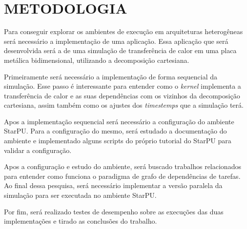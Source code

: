 
\chapter{METODOLOGIA}
\label{chap:metodologia}

Para conseguir explorar os ambientes de execução em arquiteturas heterogêneas será necessário a implementação de uma aplicação.
Essa aplicação que será desenvolvida será a de uma simulação de transferência de calor em uma placa metálica bidimensional,
utilizando a decomposição cartesiana.

Primeiramente será necessário a implementação de forma sequencial da simulação.
Esse passo é interessante para entender como o \textit{kernel} implementa a transferência de calor e as suas dependências com os vizinhos
da decomposição cartesiana, assim também como os ajustes dos \textit{timestemps} que a simulação terá.

Apos a implementação sequencial será necessário a configuração do ambiente StarPU.
Para a configuração do mesmo, será estudado a documentação do ambiente e implementado alguns scripts do próprio tutorial do StarPU
para validar a configuração.

Apos a configuração e estudo do ambiente, será buscado trabalhos relacionados para entender como funciona o paradigma de grafo de dependências de tarefas.
Ao final dessa pesquisa, será necessário implementar a versão paralela da simulação para ser executada no ambiente StarPU.

Por fim, será realizado testes de desempenho sobre as execuções das duas implementações e tirado as conclusões do trabalho.